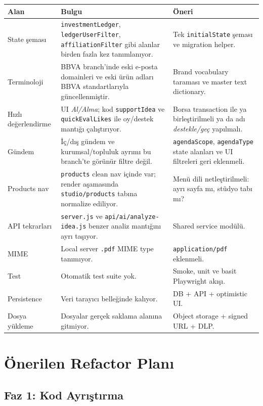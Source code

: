 \documentclass[11pt,a4paper]{article}
\newcommand{\code}[1]{\texttt{#1}}
\begin{document}
\begin{longtable}{p{}p{}p{}}
\toprule
\textbf{Alan} & \textbf{Bulgu} & \textbf{Öneri}\\
\midrule
State şeması & \code{investmentLedger}, \code{ledgerUserFilter}, \code{affiliationFilter} gibi alanlar birden fazla kez tanımlanıyor. & Tek \code{initialState} şeması ve migration helper.\\
Terminoloji & BBVA branch'inde eski e-posta domainleri ve eski ürün adları BBVA standartlarıyla güncellenmiştir. & Brand vocabulary taraması ve master text dictionary.\\
Hızlı değerlendirme & UI \textit{Al/Alma}; kod \code{supportIdea} ve \code{quickEvalLikes} ile oy/destek mantığı çalıştırıyor. & Borsa transaction ile ya birleştirilmeli ya da adı \textit{destekle/geç} yapılmalı.\\
Gündem & İç/dış gündem ve kurumsal/topluluk ayrımı bu branch'te görünür filtre değil. & \code{agendaScope}, \code{agendaType} state alanları ve UI filtreleri geri eklenmeli.\\
Products nav & \code{products} clean nav içinde var; render aşamasında \code{studio/products} tabına normalize ediliyor. & Menü dili netleştirilmeli: ayrı sayfa mı, stüdyo tabı mı?\\
API tekrarları & \code{server.js} ve \code{api/ai/analyze-idea.js} benzer analiz mantığını ayrı taşıyor. & Shared service modülü.\\
MIME & Local server \code{.pdf} MIME type tanımıyor. & \code{application/pdf} eklenmeli.\\
Test & Otomatik test suite yok. & Smoke, unit ve basit Playwright akışı.\\
Persistence & Veri tarayıcı belleğinde kalıyor. & DB + API + optimistic UI.\\
Dosya yükleme & Dosyalar gerçek saklama alanına gitmiyor. & Object storage + signed URL + DLP.\\
\bottomrule
\end{longtable}

\section{Önerilen Refactor Planı}

\subsection{Faz 1: Kod Ayrıştırma}
\end{document}

